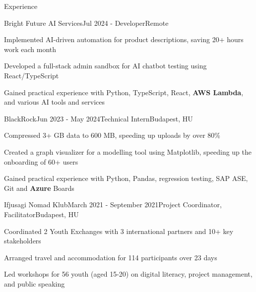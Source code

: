 \documentclass[
	a4paper, %
	11pt, %
]{resume} %
\begin{document}
\begin{rSection}{Experience}

	\begin{rSubsection}{Bright Future AI Services}{Jul 2024 - }{Developer}{Remote}
		\item Implemented AI-driven automation for product descriptions, saving 20+ hours work each month
		\item Developed a full-stack admin sandbox for AI chatbot testing using React/TypeScript
		\item Gained practical experience with Python, TypeScript, React, \textbf{AWS Lambda}, and various AI tools and services
	\end{rSubsection}

	\begin{rSubsection}{BlackRock}{Jun 2023 - May 2024}{Technical Intern}{Budapest, HU}
		\item Compressed 3+ GB data to 600 MB, speeding up uploads by over 80\%
		\item Created a graph visualizer for a modelling tool using Matplotlib, speeding up the onboarding of 60+ users
		\item Gained practical experience with Python, Pandas, regression testing, SAP ASE, Git and \textbf{Azure} Boards
	\end{rSubsection}

	\begin{rSubsection}{Ifjusagi Nomad Klub}{March 2021 - September 2021}{Project Coordinator, Facilitator}{Budapest, HU}
		\item Coordinated 2 Youth Exchanges with 3 international partners and 10+ key stakeholders
		\item Arranged travel and accommodation for 114 participants over 23 days
		\item Led workshops for 56 youth (aged 15-20) on digital literacy, project management, and public speaking
	\end{rSubsection}

\end{rSection}

\end{document}
